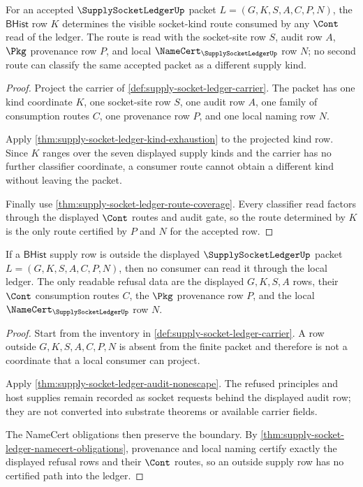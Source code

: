\begin{theorem}
\label{thm:supply-socket-ledger-kind-route-determinacy}
For an accepted $\SupplySocketLedgerUp$ packet $L=(G,K,S,A,C,P,N)$, the
$\mathsf{BHist}$ row $K$ determines the visible socket-kind route consumed by
any $\Cont$ read of the ledger. The route is read with the socket-site row
$S$, audit row $A$, $\Pkg$ provenance row $P$, and local
$\NameCert_{\SupplySocketLedgerUp}$ row $N$; no second route can classify the
same accepted packet as a different supply kind.
\end{theorem}
\begin{proof}
Project the carrier of \autoref{def:supply-socket-ledger-carrier}. The packet
has one kind coordinate $K$, one socket-site row $S$, one audit row $A$, one
family of consumption routes $C$, one provenance row $P$, and one local naming
row $N$.

Apply \autoref{thm:supply-socket-ledger-kind-exhaustion} to the projected
kind row. Since $K$ ranges over the seven displayed supply kinds and the
carrier has no further classifier coordinate, a consumer route cannot obtain a
different kind without leaving the packet.

Finally use \autoref{thm:supply-socket-ledger-route-coverage}. Every
classifier read factors through the displayed $\Cont$ routes and audit gate,
so the route determined by $K$ is the only route certified by $P$ and $N$ for
the accepted row.
\end{proof}

\begin{theorem}
\label{thm:supply-socket-ledger-refused-row-nonescape}
If a $\mathsf{BHist}$ supply row is outside the displayed
$\SupplySocketLedgerUp$ packet $L=(G,K,S,A,C,P,N)$, then no consumer can read
it through the local ledger. The only readable refusal data are the displayed
$G,K,S,A$ rows, their $\Cont$ consumption routes $C$, the $\Pkg$ provenance
row $P$, and the local $\NameCert_{\SupplySocketLedgerUp}$ row $N$.
\end{theorem}
\begin{proof}
Start from the inventory in \autoref{def:supply-socket-ledger-carrier}. A row
outside $G,K,S,A,C,P,N$ is absent from the finite packet and therefore is not a
coordinate that a local consumer can project.

Apply \autoref{thm:supply-socket-ledger-audit-nonescape}. The refused
principles and host supplies remain recorded as socket requests behind the
displayed audit row; they are not converted into substrate theorems or
available carrier fields.

The NameCert obligations then preserve the boundary. By
\autoref{thm:supply-socket-ledger-namecert-obligations}, provenance and local
naming certify exactly the displayed refusal rows and their $\Cont$ routes, so
an outside supply row has no certified path into the ledger.
\end{proof}

